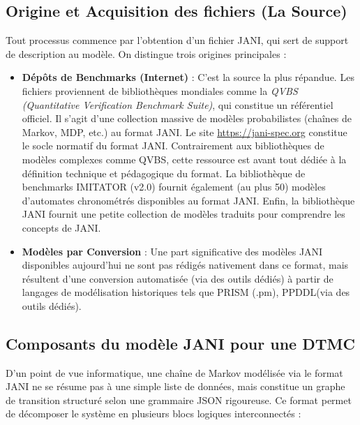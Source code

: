 \documentclass[14pt, a4paper]{extarticle}
\begin{document}
\subsection{Origine et Acquisition des fichiers (La Source)}
Tout processus commence par l'obtention d'un fichier JANI, qui sert de support de description au modèle. On distingue trois origines principales :
\begin{itemize}
    \item \textbf{Dépôts de Benchmarks (Internet)} : C'est la source la plus répandue. Les fichiers proviennent de bibliothèques mondiales comme la \textit{QVBS (Quantitative Verification Benchmark Suite)}, qui constitue un référentiel officiel. Il s'agit d'une collection massive de modèles probabilistes (chaînes de Markov, MDP, etc.) au format JANI. Le site \url{https://jani-spec.org} constitue le socle normatif du format JANI. Contrairement aux bibliothèques de modèles complexes comme QVBS, cette ressource est avant tout dédiée à la définition technique et pédagogique du format. La bibliothèque de benchmarks IMITATOR (v2.0) fournit également (au plus 50) modèles d'automates chronométrés disponibles au format JANI. Enfin, la bibliothèque JANI fournit une petite collection de modèles traduits pour comprendre les concepts de JANI.
    \item \textbf{Modèles par Conversion} : Une part significative des modèles JANI disponibles aujourd'hui ne sont pas rédigés nativement dans ce format, mais résultent d'une conversion automatisée (via des outils dédiés) à partir de langages de modélisation historiques tels que PRISM (.pm), PPDDL(via des outils dédiés).
\end{itemize}
\subsection{Composants du modèle JANI pour une DTMC}

D'un point de vue informatique, une chaîne de Markov modélisée via le format JANI ne se résume pas à une simple liste de données, mais constitue un graphe de transition structuré selon une grammaire JSON rigoureuse. Ce format permet de décomposer le système en plusieurs blocs logiques interconnectés :
\end{document}
